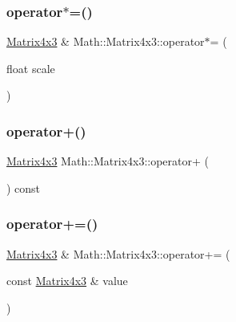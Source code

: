 \mbox{\label{struct_math_1_1_matrix4x3_acbd4b417e9851ef61853fb7238818d01}} 
\subsubsection{\texorpdfstring{operator$\ast$=()}{operator*=()}\hspace{0.1cm}{\footnotesize\ttfamily [2/2]}}
{\footnotesize\ttfamily \mbox{\hyperlink{struct_math_1_1_matrix4x3}{Matrix4x3}} \& Math\+::\+Matrix4x3\+::operator$\ast$= (\begin{DoxyParamCaption}\item[{float}]{scale }\end{DoxyParamCaption})}

\mbox{\label{struct_math_1_1_matrix4x3_af15226cd8a563832c7be454e3c3dbd66}} 
\subsubsection{\texorpdfstring{operator+()}{operator+()}}
{\footnotesize\ttfamily \mbox{\hyperlink{struct_math_1_1_matrix4x3}{Matrix4x3}} Math\+::\+Matrix4x3\+::operator+ (\begin{DoxyParamCaption}{ }\end{DoxyParamCaption}) const}

\mbox{\label{struct_math_1_1_matrix4x3_abb52d4ffdbc905e8628f4e6595bcd42e}} 
\subsubsection{\texorpdfstring{operator+=()}{operator+=()}}
{\footnotesize\ttfamily \mbox{\hyperlink{struct_math_1_1_matrix4x3}{Matrix4x3}} \& Math\+::\+Matrix4x3\+::operator+= (\begin{DoxyParamCaption}\item[{const \mbox{\hyperlink{struct_math_1_1_matrix4x3}{Matrix4x3}} \&}]{value }\end{DoxyParamCaption})}

